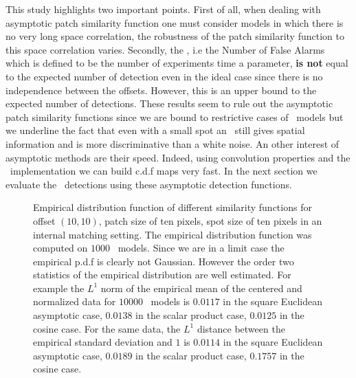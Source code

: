  This study highlights two important points. First of all, when dealing with asymptotic patch similarity function one must consider models in which there is no very long space correlation, the robustness of the patch similarity function to this space correlation varies. Secondly, the \NFA , i.e the Number of False Alarms which is defined to be the number of experiments time a parameter, \textbf{is not} equal to the expected number of detection even in the ideal case since there is no independence between the offsets. However, this \NFA is an upper bound to the expected number of detections. These results seem to rule out the asymptotic patch similarity functions since we are bound to restrictive cases of \ADSN \ models but we underline the fact that even with a small spot an \ADSN \ still gives spatial information and is more discriminative than a white noise. An other interest of asymptotic methods are their speed. Indeed, using convolution properties and the \FFT \ implementation we can build c.d.f maps very fast. In the next section we evaluate the \acontrario \ detections using these asymptotic detection functions.
  \begin{figure}[H]
    \centering
     \hfill
     \hfill
    \caption{Empirical distribution function of different similarity functions for offset $(10,10)$, patch size of ten pixels, spot size of ten pixels in an internal matching setting. The empirical distribution function was computed on $1000$ \ADSN \ models. Since we are in a limit case the empirical p.d.f is clearly not Gaussian. However the order two statistics of the empirical distribution are well estimated. For example the $L^1$ norm of the empirical mean of the centered and normalized data for $10000$ \ADSN \ models is $0.0117$ in the square Euclidean asymptotic case, $0.0138$ in the scalar product case, $0.0125$ in the cosine case. For the same data, the $L^1$ distance between the empirical standard deviation and $1$ is $0.0114$ in the square Euclidean asymptotic case, $0.0189$ in the scalar product case, $0.1757$ in the cosine case.}
    \label{fig:isgaussian_internal}    
  \end{figure}


